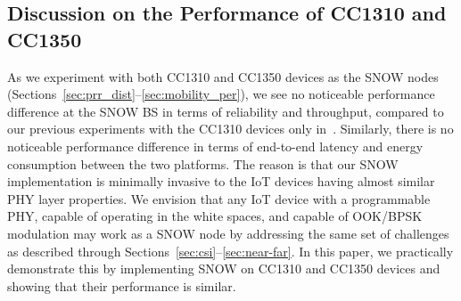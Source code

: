\subsection{Discussion on the Performance of CC1310 and CC1350}
As we experiment with both CC1310 and CC1350 devices as the SNOW nodes (Sections~\ref{sec:prr_dist}--\ref{sec:mobility_per}), we see no noticeable performance difference at the SNOW BS in terms of reliability and throughput, compared to our previous experiments with the CC1310 devices only in~\cite{snow_cots}. Similarly, there is no noticeable performance difference in terms of end-to-end latency and energy consumption between the two platforms. 
The reason is that our SNOW implementation is minimally invasive to the IoT devices having almost similar PHY layer properties. We envision that any IoT device with a programmable PHY, capable of operating in the white spaces, and capable of OOK/BPSK modulation may work as a SNOW node by addressing the same set of challenges as described through Sections~\ref{sec:csi}--\ref{sec:near-far}. In this paper, we practically demonstrate this by implementing SNOW on CC1310 and CC1350 devices and showing that their performance is similar.
























